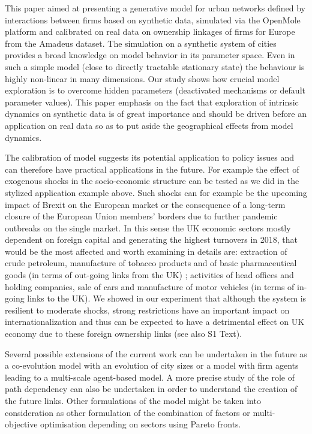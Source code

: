 \documentclass[10pt,letterpaper]{article}
\begin{document}
This paper aimed at presenting a generative model for urban networks defined by interactions between firms based on synthetic data, simulated via the OpenMole platform and calibrated on real data on ownership linkages of firms for Europe from the Amadeus dataset. The simulation on a synthetic system of cities provides a broad knowledge on model behavior in its parameter space. Even in such a simple model (close to directly tractable stationary state) the behaviour is highly non-linear in many dimensions. Our study shows how crucial model exploration is to overcome hidden parameters (deactivated mechanisms or default parameter values). This paper emphasis on the fact that exploration of intrinsic dynamics on synthetic data is of great importance and should be driven before an application on real data so as to put aside the geographical effects from model dynamics.

The calibration of model suggests its potential application to policy issues and can therefore have practical applications in the future. For example the effect of exogenous shocks in the socio-economic structure can be tested as we did in the stylized application example above. Such shocks can for example be the upcoming impact of Brexit on the European market or the consequence of a long-term closure of the European Union members' borders due to further pandemic outbreaks on the single market. In this sense the UK economic sectors mostly dependent on foreign capital and generating the highest turnovers in 2018, that would be the most affected and worth examining in details are: extraction of crude petroleum, manufacture of tobacco products and of basic pharmaceutical goods (in terms of out-going links from the UK) ; activities of head offices and holding companies, sale of cars and manufacture of motor vehicles (in terms of in-going links to the UK). We showed in our experiment that although the system is resilient to moderate shocks, strong restrictions have an important impact on internationalization and thus can be expected to have a detrimental effect on UK economy due to these foreign ownership links (see also S1 Text).

Several possible extensions of the current work can be undertaken in the future as a co-evolution model with an evolution of city sizes or a model with firm agents leading to a multi-scale agent-based model. A more precise study of the role of path dependency can also be undertaken in order to understand the creation of the future links. Other formulations of the model might be taken into consideration as other formulation of the combination of factors or multi-objective optimisation depending on sectors using Pareto fronts.  
\end{document}
